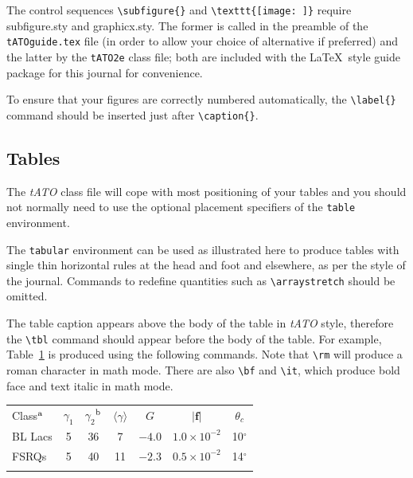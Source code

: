 \documentclass{tATO2e}
\begin{document}
The control sequences \verb"\subfigure{}" and \verb"\texttt{[image: ]}" require subfigure.sty and graphicx.sty.
The former is called in the preamble of the \texttt{tATOguide.tex} file (in order to allow your choice of alternative if preferred)
and the latter by the \texttt{tATO2e} class file; both are included with the \LaTeX\ style guide package for this journal for convenience.

To ensure that your figures are correctly numbered automatically, the \verb"\label{}" command should be inserted just
after \verb"\caption{}".


\subsection{Tables}

The \textit{tATO} class file will cope with most positioning of your tables and you should not normally need to use the optional
placement specifiers of the \texttt{table} environment.

The \texttt{tabular} environment can be used as illustrated here to produce tables with single thin horizontal rules at the
head and foot and elsewhere, as per the style of the journal. Commands to redefine quantities such as \verb"\arraystretch"
should be omitted.

The table caption appears above the body of the table in \textit{tATO} style, therefore the \verb"\tbl" command should appear before
the body of the table. For example, Table~\ref{symbols} is produced using the following commands. Note that \verb"\rm" will
produce a roman character in math mode. There are also \verb"\bf" and \verb"\it", which produce bold face and text italic in math mode.

\begin{table}
{\begin{tabular}[l]{@{}lcccccc}\toprule
  Class$^{\rm a}$ & $\gamma _1$ & $\gamma _2$$^{\rm b}$
         & $\langle \gamma \rangle$ & $G$ & $|{\bm f}|$ & $\theta _{c}$ \\
\colrule
  BL Lacs &5 & 36 & 7 & $-4.0$ & $1.0\times 10^{-2}$ & 10$^\circ$ \\
  FSRQs & 5 & 40 & 11 & $-2.3$ & $0.5\times 10^{-2}$ & 14$^\circ$ \\
\botrule
\end{tabular}}
\label{symbols}
\end{table}
\end{document}
